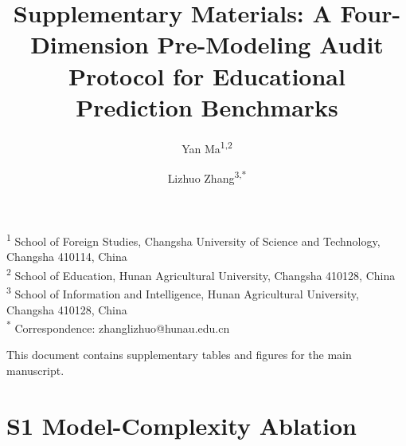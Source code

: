 \documentclass[10pt,letterpaper]{article}
\title{\vspace*{-0.8in}\Large\textbf{Supplementary Materials: A Four-Dimension Pre-Modeling Audit Protocol for Educational Prediction Benchmarks}}
\author{Yan Ma\textsuperscript{1,2} \and Lizhuo Zhang\textsuperscript{3,*}}
\date{}
\begin{document}
\maketitle
\vspace{-0.4in}
\noindent\textsuperscript{1} School of Foreign Studies, Changsha University of Science and Technology, Changsha 410114, China\\
\textsuperscript{2} School of Education, Hunan Agricultural University, Changsha 410128, China\\
\textsuperscript{3} School of Information and Intelligence, Hunan Agricultural University, Changsha 410128, China\\
\textsuperscript{*} Correspondence: zhanglizhuo@hunau.edu.cn

\vspace{0.2in}

This document contains supplementary tables and figures for the main manuscript.

\section*{S1 Model-Complexity Ablation}
\end{document}
